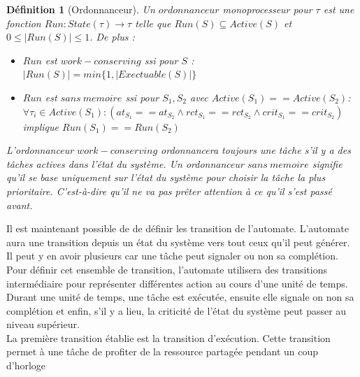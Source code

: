 \documentclass[12pt,a4paper,oneside]{book}
\theoremstyle{break}
\newtheorem{defin}{Définition}[chapter]
\theoremstyle{breakplain}
\begin{document}
\begin{defin}[Ordonnanceur]
Un $ordonnanceur$ monoprocesseur pour $\tau$ est une fonction $Run : State(\tau) \rightarrow \tau$ telle que $Run(S) \subseteq Active(S)$ et $0 \leq |Run(S)| \leq 1$.
De plus :
\begin{itemize}
\item $Run$ est $work-conserving$ ssi pour $S$ : $ |Run(S)| = min\{1, |Exectuable(S)|\}$
\item $Run$ est $sans\ memoire$ ssi pour $S_1,S_2$ avec $Active(S_1) == Active(S_2)$:
$\forall \tau_i \in Active(S_1) : (at_{S_1} == at_{S_2} \wedge rct_{S_1} == rct_{S_2} \wedge crit_{S_1} == crit_{S_2} )$ implique $Run(S_1) == Run(S_2)$
\end{itemize}

L'ordonnanceur $work-conserving$ ordonnancera toujours une tâche s'il y a des tâches actives dans l'état du système. Un ordonnanceur $sans\ memoire$ signifie qu'il se base uniquement sur l'état du système pour choisir la tâche la plus prioritaire. C'est-à-dire qu'il ne va pas prêter attention à ce qu'il s'est passé avant.
\end{defin}

Il est maintenant possible de de définir les transition de l'automate. L'automate aura une transition depuis un état du système vers tout ceux qu'il peut générer. Il peut y en avoir plusieurs car une tâche peut signaler ou non sa complétion.\\
Pour définir cet ensemble de transition, l'automate utilisera des transitions intermédiaire pour représenter différentes action au cours d'une unité de temps.\\

Durant une unité de temps, une tâche est exécutée, ensuite elle signale on non sa complétion et enfin, s'il y a lieu, la criticité de l'état du système peut passer  au niveau supérieur.\\

La première transition établie est la transition d'exécution. Cette transition permet à une tâche de profiter de la ressource partagée pendant un coup d'horloge
\end{document}

